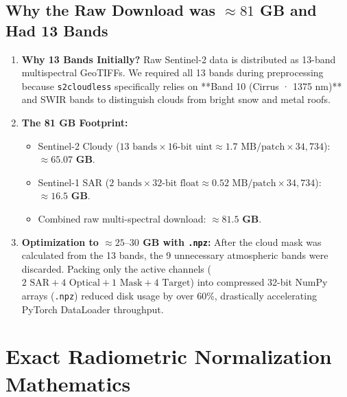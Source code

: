 \documentclass[11pt,a4paper]{article}
\begin{document}
\subsection{Why the Raw Download was $\approx 81$ GB and Had 13 Bands}
\begin{enumerate}[leftmargin=1.5em]
    \item \textbf{Why 13 Bands Initially?} Raw Sentinel-2 data is distributed as 13-band multispectral GeoTIFFs. We required all 13 bands during preprocessing because \texttt{s2cloudless} specifically relies on **Band 10 (Cirrus · 1375 nm)** and SWIR bands to distinguish clouds from bright snow and metal roofs.
    \item \textbf{The 81 GB Footprint:} 
    \begin{itemize}
        \item Sentinel-2 Cloudy ($13\text{ bands} \times 16\text{-bit uint} \approx 1.7\text{ MB/patch} \times 34,734$): $\approx \mathbf{65.07\text{ GB}}$.
        \item Sentinel-1 SAR ($2\text{ bands} \times 32\text{-bit float} \approx 0.52\text{ MB/patch} \times 34,734$): $\approx \mathbf{16.5\text{ GB}}$.
        \item Combined raw multi-spectral download: $\mathbf{\approx 81.5\text{ GB}}$.
    \end{itemize}
    \item \textbf{Optimization to $\approx 25\text{--}30$ GB with \texttt{.npz}:} After the cloud mask was calculated from the 13 bands, the 9 unnecessary atmospheric bands were discarded. Packing only the active channels ($2\text{ SAR} + 4\text{ Optical} + 1\text{ Mask} + 4\text{ Target}$) into compressed 32-bit NumPy arrays (\texttt{.npz}) reduced disk usage by over 60\%, drastically accelerating PyTorch DataLoader throughput.
\end{enumerate}

\section{Exact Radiometric Normalization Mathematics}
\end{document}
